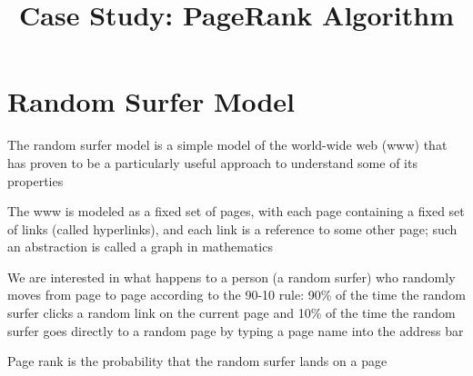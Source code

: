 \documentclass[8pt,a4paper,compress]{beamer}
\title{Case Study: PageRank Algorithm}
\date{}
\begin{document}
\begin{frame}
\vfill
\titlepage
\end{frame}

\section{Random Surfer Model}
\begin{frame}[fragile]
\pause

The random surfer model is a simple model of the world-wide web (www) that has proven to be a particularly useful approach to understand some of its properties

\pause\bigskip

The www is modeled as a fixed set of pages, with each page containing a fixed set of links (called hyperlinks), and each link is a reference to some other page; such an abstraction is called a graph in mathematics

\pause\bigskip

We are interested in what happens to a person (a random surfer) who randomly moves from page to page according to the 90-10 rule: 90\% of the time the random surfer clicks a random link on the current page and 10\% of the time the random surfer goes directly to a random page by typing a page name into the address bar

\pause\bigskip

Page rank is the probability that the random surfer lands on a page
\end{frame}
\end{document}
